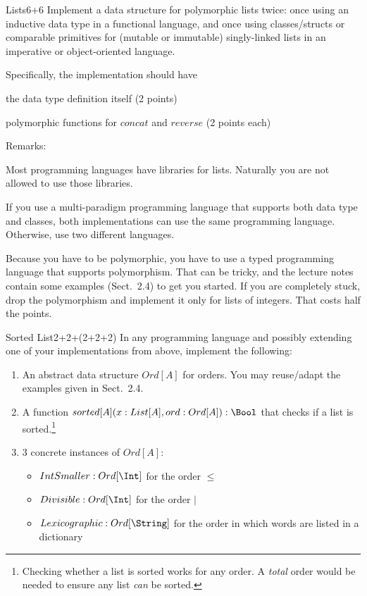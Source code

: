 \documentclass[a4paper]{article}
\begin{document}
\begin{problem}{Lists}{6+6}
Implement a data structure for polymorphic lists twice: once using an inductive data type in a functional language, and once using classes/structs or comparable primitives for (mutable or immutable) singly-linked lists in an imperative or object-oriented language.

Specifically, the implementation should have
\begin{compactitem}
 \item the data type definition itself (2 points)
 \item polymorphic functions for $concat$ and $reverse$ (2 points each)
\end{compactitem}

Remarks:
\begin{compactitem}
\item Most programming languages have libraries for lists.
Naturally you are not allowed to use those libraries.
\item If you use a multi-paradigm programming language that supports both data type and classes, both implementations can use the same programming language.
Otherwise, use two different languages.
\item Because you have to be polymorphic, you have to use a typed programming language that supports polymorphism.
That can be tricky, and the lecture notes contain some examples (Sect.~2.4) to get you started.
If you are completely stuck, drop the polymorphism and implement it only for lists of integers.
That costs half the points.
\end{compactitem}
\end{problem}


\begin{problem}{Sorted List}{2+2+(2+2+2)}
In any programming language and possibly extending one of your implementations from above, implement the following:
\begin{enumerate}
 \item An abstract data structure $Ord[A]$ for orders. You may reuse/adapt the examples given in Sect.~2.4.
 \item A function $sorted[A](x: List[A], ord: Ord[A]): \Bool$ that checks if a list is sorted.\footnote{Checking whether a list is sorted works for any order. A \emph{total} order would be needed to ensure any list \emph{can} be sorted.}
 \item $3$ concrete instances of $Ord[A]$:
  \begin{itemize}
   \item $IntSmaller:Ord[\Int]$ for the order  $\leq$
   \item $Divisible:Ord[\Int]$ for the order $|$
   \item $Lexicographic:Ord[\String]$ for the order in which words are listed in a dictionary
  \end{itemize}
\end{enumerate}
\end{problem}
\end{document}
